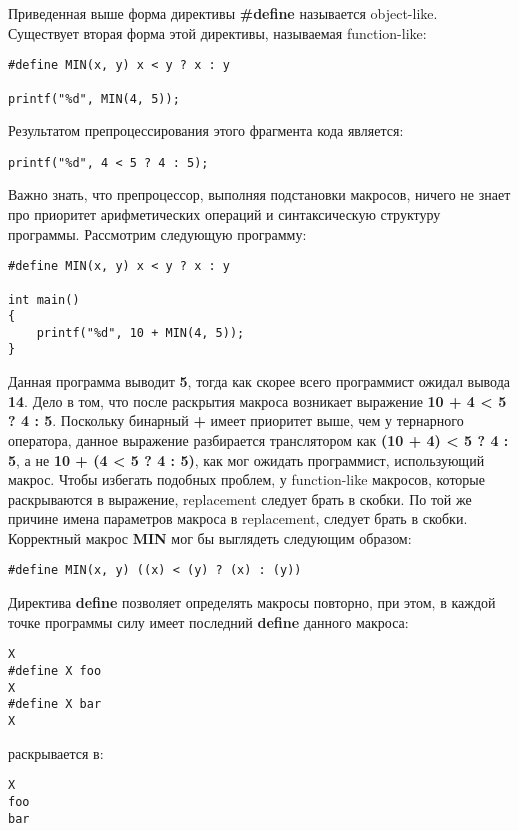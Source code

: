 Приведенная выше форма директивы {\bf \#define} называется object-like. Существует вторая форма этой директивы, называемая function-like:
\begin{verbatim}
#define MIN(x, y) x < y ? x : y

printf("%d", MIN(4, 5));
\end{verbatim}
Результатом препроцессирования этого фрагмента кода является:
\begin{verbatim}
printf("%d", 4 < 5 ? 4 : 5);
\end{verbatim}

Важно знать, что препроцессор, выполняя подстановки макросов, ничего не знает про приоритет арифметических операций и синтаксическую структуру программы. Рассмотрим следующую программу:
\begin{verbatim}
#define MIN(x, y) x < y ? x : y

int main()
{
    printf("%d", 10 + MIN(4, 5));
}
\end{verbatim}
Данная программа выводит {\bf 5}, тогда как скорее всего программист ожидал вывода {\bf 14}. Дело в том, что после раскрытия макроса возникает выражение {\bf 10 + 4 < 5 ? 4 : 5}. Поскольку бинарный {\bf +} имеет приоритет выше, чем у тернарного оператора, данное выражение разбирается транслятором как {\bf (10 + 4) < 5 ? 4 : 5}, а не {\bf 10 + (4 < 5 ? 4 : 5)}, как мог ожидать программист, использующий макрос. Чтобы избегать подобных проблем, у function-like макросов, которые раскрываются в выражение, replacement следует брать в скобки. По той же причине имена параметров макроса в replacement, следует брать в скобки. Корректный макрос {\bf MIN} мог бы выглядеть следующим образом:
\begin{verbatim}
#define MIN(x, y) ((x) < (y) ? (x) : (y))
\end{verbatim}

Директива {\bf define} позволяет определять макросы повторно, при этом, в каждой точке программы силу имеет последний {\bf define} данного макроса:
\begin{verbatim}
X
#define X foo
X
#define X bar
X
\end{verbatim}
раскрывается в:
\begin{verbatim}
X
foo
bar
\end{verbatim}

